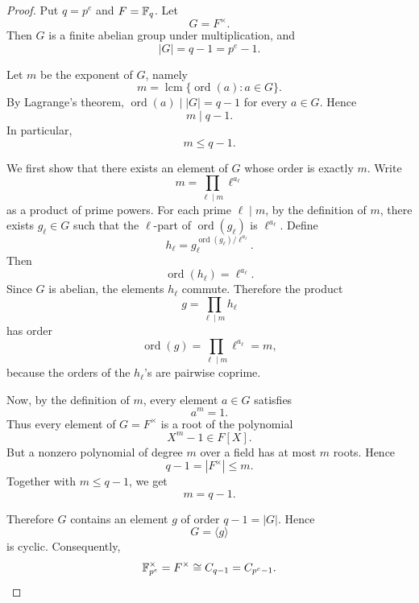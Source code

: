         \begin{proof}
        Put \(q=p^e\) and \(F=\mathbb{F}_q\). Let
        \[
            G=F^\times.
        \]
        Then \(G\) is a finite abelian group under multiplication, and
        \[
            |G|=q-1=p^e-1.
        \]
        
        Let \(m\) be the exponent of \(G\), namely
        \[
            m=\operatorname{lcm}\{\operatorname{ord}(a):a\in G\}.
        \]
        By Lagrange's theorem, \(\operatorname{ord}(a)\mid |G|=q-1\) for every \(a\in G\). Hence
        \[
            m\mid q-1.
        \]
        In particular,
        \[
            m\leq q-1.
        \]
        
        We first show that there exists an element of \(G\) whose order is exactly \(m\).
        Write
        \[
            m=\prod_{\ell\mid m}\ell^{a_\ell}
        \]
        as a product of prime powers. For each prime \(\ell\mid m\), by the definition of \(m\), there exists \(g_\ell\in G\) such that the \(\ell\)-part of \(\operatorname{ord}(g_\ell)\) is \(\ell^{a_\ell}\). Define
        \[
            h_\ell
            =
            g_\ell^{\operatorname{ord}(g_\ell)/\ell^{a_\ell}}.
        \]
        Then
        \[
            \operatorname{ord}(h_\ell)=\ell^{a_\ell}.
        \]
        Since \(G\) is abelian, the elements \(h_\ell\) commute. Therefore the product
        \[
            g=\prod_{\ell\mid m}h_\ell
        \]
        has order
        \[
            \operatorname{ord}(g)
            =
            \prod_{\ell\mid m}\ell^{a_\ell}
            =
            m,
        \]
        because the orders of the \(h_\ell\)'s are pairwise coprime.
        
        Now, by the definition of \(m\), every element \(a\in G\) satisfies
        \[
            a^m=1.
        \]
        Thus every element of \(G=F^\times\) is a root of the polynomial
        \[
            X^m-1\in F[X].
        \]
        But a nonzero polynomial of degree \(m\) over a field has at most \(m\) roots. Hence
        \[
            q-1=|F^\times|\leq m.
        \]
        Together with \(m\leq q-1\), we get
        \[
            m=q-1.
        \]
        
        Therefore \(G\) contains an element \(g\) of order \(q-1=|G|\). Hence
        \[
            G=\langle g\rangle
        \]
        is cyclic. Consequently,
        \[
            \mathbb{F}_{p^e}^{\times}
            =
            F^\times
            \cong C_{q-1}
            =
            C_{p^e-1}.
        \]
        \end{proof}


